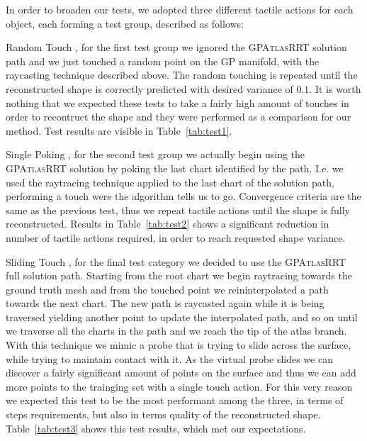 In order to broaden our tests, we adopted three different tactile actions for each object, each forming 
a test group, described as follows:
\begin{asparadesc}
    \item[Random Touch], for the first test group we ignored the \textsc{GPAtlasRRT} solution path and 
        we just touched a random point on the GP manifold, with the raycasting technique described above.
        The random touching is repeated until the reconstructed shape is correctly predicted with
        desired variance of $0.1$.
        It is worth nothing that we expected these tests to take a fairly high amount of touches
        in order to recontruct the shape and they were performed as a comparison for our method.
        Test results are visible in Table~\ref{tab:test1}.
    \item[Single Poking], for the second test group we actually begin using the \textsc{GPAtlasRRT} solution by
        poking the last chart identified by the path. I.e. we used the raytracing technique applied to the last
        chart of the solution path, performing a touch were the algorithm tells us to go.
        Convergence criteria are the same as the previous test, thus we repeat tactile actions
        until the shape is fully reconstructed. Results in Table~\ref{tab:test2} shows a significant reduction
        in number of tactile actions required, in order to reach requested shape variance.
    \item[Sliding Touch],  for the  final test  category we  decided to  use the
    \textsc{GPAtlasRRT}  full solution  path. Starting  from the  root chart  we
    begin raytracing towards the ground truth mesh and from the touched point we
    reininterpolated a  path towards the next  chart. The new path  is raycasted
    again while it is being traversed yielding another point to update the interpolated path, and so
    on until we traverse all the charts in the path and we reach the tip of the atlas branch.
    With this technique we mimic a probe that is trying to slide across the surface,
    while trying to maintain contact with it. As the virtual probe slides we can discover
    a fairly significant amount of points on the surface and thus we can add more points to the trainging set
    with a single touch action. For this very reason we expected this test to be the most performant among the three,
    in terms of steps requirements, but also in terms quality of the reconstructed shape.
    Table~\ref{tab:test3} shows this test results, which met our expectations.
\end{asparadesc}
